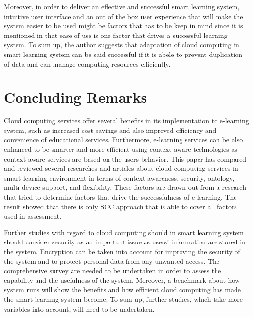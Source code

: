 \documentclass[journal]{vgtc}                %
\begin{document}
Moreover, in order to deliver an effective and successful smart learning system, intuitive user interface and an out of the box user experience that will make the system easier to be used might be factors that has to be keep in mind since it is mentioned in \cite{Sun2008} that ease of use is one factor that drives a successful learning system. To sum up, the author suggests that adaptation of cloud computing in smart learning system can be said successful if it is abele to prevent duplication of data and can manage computing resources efficiently.

\section{Concluding Remarks}
Cloud computing services offer several benefits in its implementation to e-learning system, such as increased cost savings and also improved efficiency and convenience of educational services. Furthermore, e-learning services can be also enhanced to be smarter and more efficient using context-aware technologies as context-aware services are based on the users behavior. This paper has compared and reviewed several researches and articles about cloud computing services in smart learning environment in terms of context-awareness, security, ontology, multi-device support, and flexibility. These factors are drawn out from a research that tried to determine factors that drive the successfulness of e-learning\cite{Sun2008}. The result showed that there is only SCC approach that is able to cover all factors used in assessment.

Further studies with regard to cloud computing should in smart learning system should consider security as an important issue as users' information are stored in the system. Encryption can be taken into account for improving the security of the system and to protect personal data from any unwanted access. The comprehensive survey are needed to be undertaken in order to assess the capability and the usefulness of the system. Moreover, a benchmark about how system runs will show the benefits and how efficient cloud computing has made the smart learning system become. To sum up, further studies, which take more variables into account, will need to be undertaken.




\end{document}
